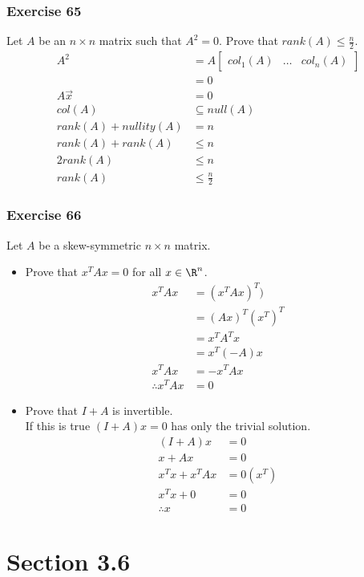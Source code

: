 \documentclass{math}
\begin{document}
\subsubsection*{Exercise 65}
Let \( A \) be an \( n\times n \) matrix such that \( A^2 = 0 \). Prove that
\( rank(A) \le \frac{n}{2} \).
\begin{align*}
  A^2 &= A\begin{bmatrix}col_1(A) & \dots & col_n(A)\end{bmatrix} \\
  &= 0 \\
  A\vec{x} &= 0 \\
  col(A) &\subseteq null(A) \\
  rank(A)+nullity(A) &= n \\
  rank(A)+rank(A) &\le n \\
  2rank(A) &\le n \\
  rank(A) &\le \frac{n}{2}
\end{align*}

\subsubsection*{Exercise 66}
Let \( A \) be a skew-symmetric \( n\times n \) matrix.
\begin{itemize}
  \item Prove that \( x^TAx = 0 \) for all \( x\in\R^n \).
  \begin{align*}
    x^TAx &= (x^TAx)^T) \\
    &= (Ax)^T(x^T)^T \\
    &= x^TA^Tx \\
    &= x^T(-A)x \\
    x^TAx &= -x^TAx \\
    \therefore x^TAx &= 0
  \end{align*}
  \item Prove that \( I+A \) is invertible. \\
  If this is true \( (I+A)x = 0 \) has only the trivial solution.
  \begin{align*}
    (I+A)x &= 0 \\
    x+Ax &= 0 \\
    x^Tx+x^TAx &= 0(x^T) \\
    x^Tx+0 &= 0 \\
    \therefore x &= 0
  \end{align*}
\end{itemize}

\section*{Section 3.6}
\end{document}
